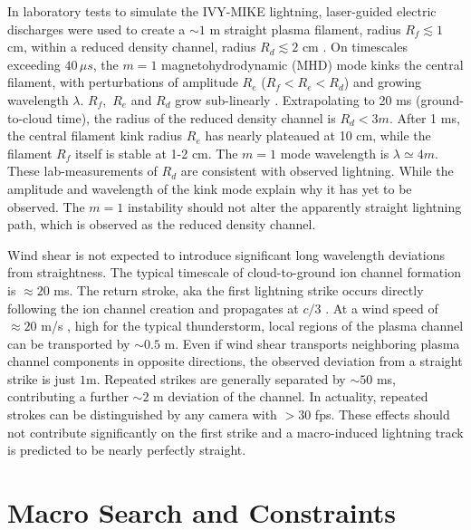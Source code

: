\documentclass[%
 reprint,
 amsmath,amssymb,
 aps,
]{revtex4-2}
\begin{document}
        In laboratory tests to simulate the IVY-MIKE lightning, laser-guided electric discharges were used to create a ${\sim 1}$ m straight plasma filament, radius $R_f\lesssim 1$ cm, within a reduced density channel, radius $R_d \lesssim 2$ cm \citep[][fig. 6]{IVY-MIKE1987}. On timescales exceeding $40 \, \mu s$, the $m=1$ magnetohydrodynamic (MHD) mode kinks the central filament, with perturbations of amplitude $R_e$ ($R_f < R_e < R_d$) and growing wavelength $\lambda$. $R_f$,\, $R_e$ and $R_d$ grow sub-linearly \citep[][fig. 9]{IVY-MIKE1987}. Extrapolating to 20 ms (ground-to-cloud time), the radius of the reduced density channel is $R_d<3m$. After 1 ms, the central filament kink radius $R_e$ has nearly plateaued at 10 cm, while the filament $R_f$ itself is stable at 1-2 cm. The $m=1$ mode wavelength is $\lambda\simeq4 m$. These lab-measurements of $R_d$ are consistent with observed lightning. While the amplitude and wavelength of the kink mode explain why it has yet to be observed. The $m=1$ instability should not alter the apparently straight lightning path, which is observed as the reduced density channel.

        Wind shear is not expected to introduce significant long wavelength deviations from straightness. The typical timescale of cloud-to-ground ion channel formation is ${\approx 20}$ ms. The return stroke, aka the first lightning strike \citep{DwyerUman2014} occurs directly following the ion channel creation and propagates at $c/3$ \citep{Idone1987}. At a wind speed of ${\approx 20}$ m/s \citep{Choi2004}, high for the typical thunderstorm, local regions of the plasma channel can be transported by ${\sim 0.5}$ m. Even if wind shear transports neighboring plasma channel components in opposite directions, the observed deviation from a straight strike is just $1$m. Repeated strikes are generally separated by ${\sim 50}$ ms, contributing a further ${\sim 2}$ m deviation of the channel. In actuality, repeated strokes can be distinguished by any camera with $>30$ fps. These effects should not contribute significantly on the first strike and a macro-induced lightning track is predicted to be nearly perfectly straight.




\section{Macro Search and Constraints}%
\label{sec:macro_search_and_constraints}
\end{document}
